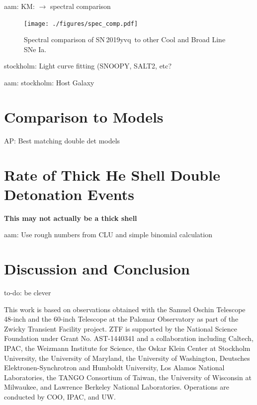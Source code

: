 \documentclass[twocolumn]{aastex63}
\newcommand{\kate}[1]{{\color{red} KM: {#1}}}
\newcommand{\abi}[1]{{\color{LincolnGreen} AP: {#1}}}
\newcommand{\aam}[1]{{\color{DarkOrange} aam: {#1}}}
\newcommand{\stockholm}[1]{{\color{cyan} stockholm: {#1}}}
\newcommand{\todo}[1]{{\color{magenta} to-do: {#1}}}
\newcommand{\sn}{SN\,2019yvq}
\begin{document}
\aam{\kate{$\longrightarrow$ spectral comparison}}

\begin{figure}
    \centering
    \texttt{[image: ./figures/spec\_comp.pdf]}
    \caption{Spectral comparison of \sn\ to other Cool and Broad Line SNe Ia.}
    \label{fig:spec_comp}
\end{figure}

\stockholm{Light curve fitting (SNOOPY, SALT2, etc?}

\aam{\stockholm{Host Galaxy}}



\section{Comparison to Models}\label{sec:models}

\abi{Best matching double det models}


\section{Rate of Thick He Shell Double Detonation Events}\label{sec:rates}

\textbf{This may not actually be a thick shell}

\aam{Use rough numbers from CLU and simple binomial calculation}

\section{Discussion and Conclusion}\label{sec:conclusions}

\todo{be clever}

\acknowledgements

This work is based on observations obtained with the Samuel Oschin Telescope
48-inch and the 60-inch Telescope at the Palomar Observatory as part of the
Zwicky Transient Facility project. ZTF is supported by the National Science
Foundation under Grant No. AST-1440341 and a collaboration including Caltech,
IPAC, the Weizmann Institute for Science, the Oskar Klein Center at Stockholm
University, the University of Maryland, the University of Washington,
Deutsches Elektronen-Synchrotron and Humboldt University, Los Alamos National
Laboratories, the TANGO Consortium of Taiwan, the University of Wisconsin at
Milwaukee, and Lawrence Berkeley National Laboratories. Operations are
conducted by COO, IPAC, and UW.

\end{document}
